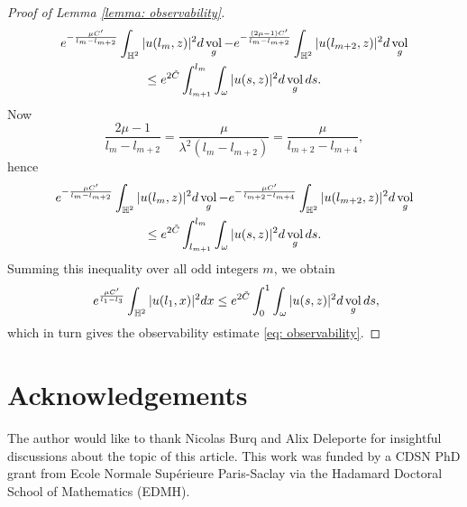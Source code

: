 \documentclass[letterpaper,11pt]{amsart}
\theoremstyle{note}
\numberwithin{equation}{section}
\DeclareMathOperator{\vol}{vol}
\begin{document}
\begin{proof}[Proof of Lemma \ref{lemma: observability}]
\begin{multline}
        e^{-\frac{\mu C'}{l_m - l_{m+2}}} \int_{\mathbb{H}^2} |u(l_m,z)|^2 d\vol_g - e^{-\frac{(2\mu-1)C'}{l_m - l_{m+2}}} \int_{\mathbb{H}^2} |u(l_{m+2},z)|^2 d\vol_g \\ \leq e^{2\Tilde{C}} \int_{l_{m+1}}^{l_m}\int_\omega|u(s,z)|^2 d\vol_g ds.
    \end{multline} Now $$\frac{2\mu-1}{l_m-l_{m+2}} = \frac{\mu}{\lambda^2 (l_m - l_{m+2})} = \frac{\mu}{l_{m+2}-l_{m+4}},$$ hence \begin{multline}
        e^{-\frac{\mu C'}{l_m-l_{m+2}}} \int_{\mathbb{H}^2} |u(l_m,z)|^2 d\vol_g - e^{-\frac{\mu C'}{l_{m+2}-l_{m+4}}} \int_{\mathbb{H}^2} |u(l_{m+2},z)|^2 d\vol_g \\ \leq e^{2\Tilde{C}} \int_{l_{m+1}}^{l_m} \int_\omega |u(s,z)|^2 d\vol_g ds.
    \end{multline} Summing this inequality over all odd integers $m$, we obtain $$\
        e^{\frac{\mu C'}{l_1-l_3}} \int_{\mathbb{H}^2} |u(l_1,x)|^2 dx \leq e^{2\Tilde{C}} \int_0^1 \int_\omega |u(s,z)|^2 d\vol_g ds,$$ which in turn gives the observability estimate \eqref{eq: observability}.
\end{proof}


\section*{Acknowledgements}

The author would like to thank Nicolas Burq and Alix Deleporte for insightful discussions about the topic of this article. This work was funded by a CDSN PhD grant from Ecole Normale Supérieure Paris-Saclay via the Hadamard Doctoral School of Mathematics (EDMH).



\end{document}
